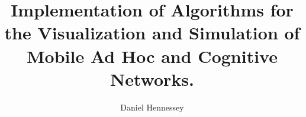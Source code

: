 \documentclass[12pt, letterpaper]{drexelthesis}
\author{Daniel Hennessey}
\title{Implementation of Algorithms for the Visualization and Simulation of Mobile Ad Hoc and Cognitive Networks.}
\begin{document}
 

	\doublespacing
	\maketitle 

\begin{preliminary}
	\sloppy
	\copyrightpage
%	
	
	\mytableofcontents
	\mylistoftables
	\mylistoffigures
	
\end{preliminary}

\begin{thesis}
	\fussy

	\singlespacing
%	
	
	
\end{thesis}
\end{document}
